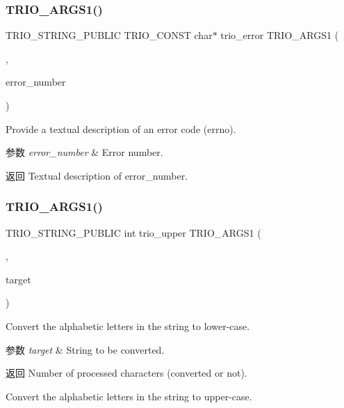\subsubsection{\texorpdfstring{T\+R\+I\+O\+\_\+\+A\+R\+G\+S1()}{TRIO\_ARGS1()}\hspace{0.1cm}{\footnotesize\ttfamily [5/7]}}
{\footnotesize\ttfamily T\+R\+I\+O\+\_\+\+S\+T\+R\+I\+N\+G\+\_\+\+P\+U\+B\+L\+IC T\+R\+I\+O\+\_\+\+C\+O\+N\+ST char$\ast$ trio\+\_\+error T\+R\+I\+O\+\_\+\+A\+R\+G\+S1 (\begin{DoxyParamCaption}\item[{(error\+\_\+number)}]{,  }\item[{int}]{error\+\_\+number }\end{DoxyParamCaption})}

Provide a textual description of an error code (errno).


\begin{DoxyParams}{参数}
{\em error\+\_\+number} & Error number. \\
\hline
\end{DoxyParams}
\begin{DoxyReturn}{返回}
Textual description of {\ttfamily error\+\_\+number}. 
\end{DoxyReturn}
\mbox{\label{group___static_strings_ga34c516423e630947655bda9817c62003}} 
\subsubsection{\texorpdfstring{T\+R\+I\+O\+\_\+\+A\+R\+G\+S1()}{TRIO\_ARGS1()}\hspace{0.1cm}{\footnotesize\ttfamily [6/7]}}
{\footnotesize\ttfamily T\+R\+I\+O\+\_\+\+S\+T\+R\+I\+N\+G\+\_\+\+P\+U\+B\+L\+IC int trio\+\_\+upper T\+R\+I\+O\+\_\+\+A\+R\+G\+S1 (\begin{DoxyParamCaption}\item[{(\hyperlink{interfacevoid}{target})}]{,  }\item[{char $\ast$}]{target }\end{DoxyParamCaption})}

Convert the alphabetic letters in the string to lower-\/case.


\begin{DoxyParams}{参数}
{\em target} & String to be converted. \\
\hline
\end{DoxyParams}
\begin{DoxyReturn}{返回}
Number of processed characters (converted or not).
\end{DoxyReturn}
Convert the alphabetic letters in the string to upper-\/case.


